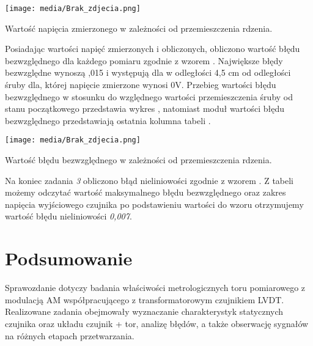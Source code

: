\documentclass{article}
\begin{document}
\begin{graph}[ht]
    \centering
    \texttt{[image: media/Brak\_zdjecia.png]}
    \caption{Wartość napięcia zmierzonego w zależności od przemieszczenia rdzenia.}
    \label{wyk3}
\end{graph}
\newpage
Posiadając wartości napięć zmierzonych i obliczonych, obliczono wartość błędu bezwzględnego dla każdego pomiaru zgodnie z wzorem . Największe błędy bezwzględne wynoszą ,015 i występują dla w odległości 4,5 cm od odległości śruby dla, której napięcie zmierzone wynosi 0V. Przebieg wartości błędu bezwzględnego w stosunku do względnego wartości przemieszczenia śruby od stanu początkowego przedstawia wykres , natomiast moduł wartości błędu bezwzględnego przedstawiają ostatnia kolumna tabeli .

\begin{graph}[ht]
    \centering
    \texttt{[image: media/Brak\_zdjecia.png]}
    \caption{Wartość błędu bezwzględnego w zależności od przemieszczenia rdzenia.}
    \label{wyk4}
\end{graph}
Na koniec zadania \textit{3} obliczono błąd nieliniowości zgodnie z wzorem . Z tabeli możemy odczytać wartość maksymalnego błędu bezwzględnego oraz zakres napięcia wyjściowego czujnika po podstawieniu wartości do wzoru otrzymujemy wartość błędu nieliniowości \textit{0,007}.
\newpage

\section{Podsumowanie}
Sprawozdanie dotyczy badania właściwości metrologicznych toru pomiarowego z modulacją AM współpracującego z transformatorowym czujnikiem LVDT. Realizowane zadania obejmowały wyznaczanie charakterystyk statycznych czujnika oraz układu czujnik + tor, analizę błędów, a także obserwację sygnałów na różnych etapach przetwarzania.
\end{document}
